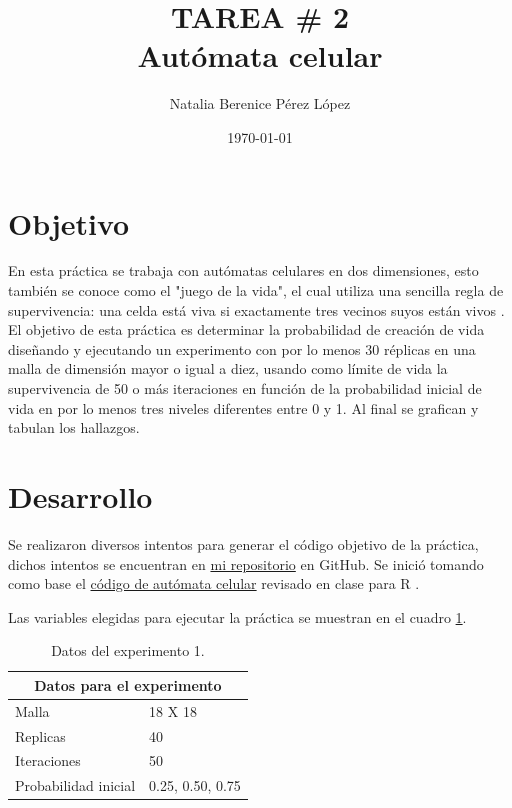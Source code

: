 \documentclass{article}
\title{TAREA \# 2 \\ Autómata celular} %
\author{Natalia Berenice P\'{e}rez L\'{o}pez} %
\date{\today}
\begin{document}

\maketitle %

\section{Objetivo}
En esta práctica se trabaja con autómatas celulares en dos dimensiones, esto también se conoce como el "juego de la vida", el cual utiliza una sencilla regla de supervivencia: una celda está viva si exactamente tres vecinos suyos están vivos \citep{1}. El objetivo de esta práctica es determinar la probabilidad de creación de vida diseñando y ejecutando un experimento con por lo menos 30 réplicas en una malla de dimensión mayor o igual a diez, usando como límite de vida la supervivencia de 50 o más iteraciones en función de la probabilidad inicial de vida en por lo menos tres niveles diferentes entre 0 y 1. Al final se grafican y tabulan los hallazgos.

\section{Desarrollo} %
Se realizaron diversos intentos para generar el código objetivo de la práctica, dichos intentos se encuentran en \href{https://github.com/nataliaperez0/Simulation/tree/main/Tarea2}{mi repositorio}  en GitHub. Se inició tomando como base el \href{https://github.com/satuelisa/Simulation/blob/master/CellularAutomata/gameOfLife.R}{código de autómata celular} revisado en clase para R \citep{2}. 

Las variables elegidas para ejecutar la práctica se muestran en el cuadro \ref{Cuadro 1}.

\begin{table}[ht]
\centering
\begin{tabular}{ |p{3cm}||p{3cm}|}
 \hline
 \multicolumn{2}{|c|}{Datos para el experimento} \\
 \hline
 Malla       & 18 X 18 \\
 \hline
 Replicas    & 40 \\
 \hline
 Iteraciones & 50 \\
 \hline
 Probabilidad inicial & 0.25, 0.50, 0.75 \\
 \hline
\end{tabular}
\caption{Datos del experimento 1.}
\label{Cuadro 1}
\end{table}
\end{document}
